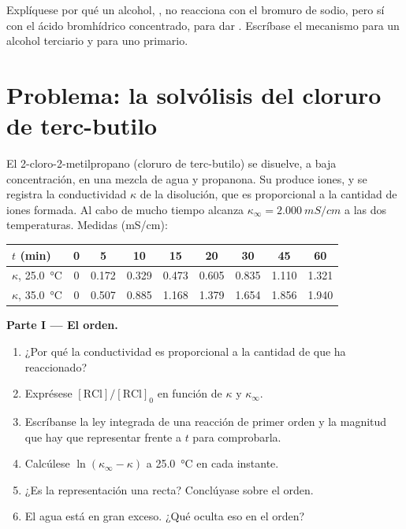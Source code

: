 \begin{exercise}[$\star\star\star$]\label{exo:b1:nucleophilic-substitution:12}
Explíquese por qué un alcohol, , no reacciona con el bromuro de
sodio, pero sí con el ácido bromhídrico concentrado, para dar .
Escríbase el mecanismo para un alcohol terciario y para uno primario.
\end{exercise}

\section{Problema: la solvólisis del cloruro de terc-butilo}

\begin{problem}
\label{pb:b1:nucleophilic-substitution:1}
El 2-cloro-2-metilpropano (cloruro de terc-butilo) se disuelve, a baja
concentración, en una mezcla de agua y propanona. Su 
 produce iones, y se registra
la conductividad $\kappa$ de la disolución, que es proporcional a la
cantidad de iones formada. Al cabo de mucho tiempo alcanza
$\kappa_\infty = \qty{2.000}{mS/cm}$ a las dos temperaturas. Medidas
(\unit{mS/cm}):

\begin{center}
\begin{tabular}{lcccccccc}
\hline
$t$ (min) & 0 & 5 & 10 & 15 & 20 & 30 & 45 & 60 \\
\hline
$\kappa$, \qty{25.0}{\celsius} & 0 & 0.172 & 0.329 & 0.473 & 0.605 & 0.835 & 1.110 & 1.321 \\
$\kappa$, \qty{35.0}{\celsius} & 0 & 0.507 & 0.885 & 1.168 & 1.379 & 1.654 & 1.856 & 1.940 \\
\hline
\end{tabular}
\end{center}

\medskip
\noindent\textbf{Parte I --- El orden.}
\begin{enumerate}
  \item ¿Por qué la conductividad es proporcional a la cantidad de
         que ha reaccionado?
  \item Exprésese $[\mathrm{RCl}]/[\mathrm{RCl}]_0$ en función de $\kappa$ y
        $\kappa_\infty$.
  \item Escríbanse la ley integrada de una reacción de primer orden y la
        magnitud que hay que representar frente a $t$ para comprobarla.
  \item Calcúlese $\ln(\kappa_\infty - \kappa)$ a \qty{25.0}{\celsius} en
        cada instante.
  \item ¿Es la representación una recta? Conclúyase sobre el orden.
  \item El agua está en gran exceso. ¿Qué oculta eso en el orden?
\end{enumerate}


\end{problem}
